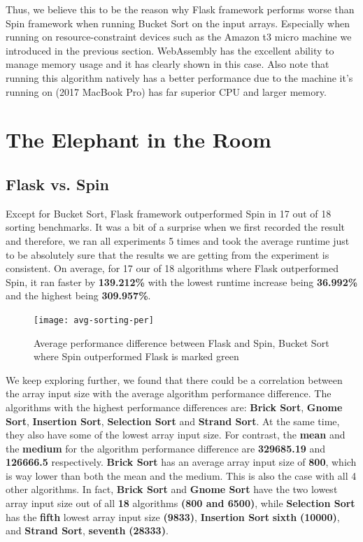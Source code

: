 Thus, we believe this to be the reason why Flask framework performs worse than Spin framework when running Bucket Sort on the input arrays. Especially when running on resource-constraint devices such as the Amazon t3 micro machine we introduced in the previous section. WebAssembly has the excellent ability to manage memory usage and it has clearly shown in this case. Also note that running this algorithm natively has a better performance due to the machine it's running on (2017 MacBook Pro) has far superior CPU and larger memory.

\bigskip
\section{The Elephant in the Room}

\subsection{Flask vs. Spin}

Except for Bucket Sort, Flask framework outperformed Spin in 17 out of 18 sorting benchmarks. It was a bit of a surprise when we first recorded the result and therefore, we ran all experiments 5 times and took the average runtime just to be absolutely sure that the results we are getting from the experiment is consistent. On average, for 17 our of 18 algorithms where Flask outperformed Spin, it ran faster by \textbf{139.212\%} with the lowest runtime increase being \textbf{36.992\%} and the highest being \textbf{309.957\%}.

\bigskip
\begin{figure}[hp]
\centering
\texttt{[image: avg-sorting-per]}
\caption{\footnotesize{Average performance difference between Flask and Spin, Bucket Sort where Spin outperformed Flask is marked green}}
\captionsetup{aboveskip=0pt,font=it}
\end{figure}
\bigskip

We keep exploring further, we found that there could be a correlation between the array input size with the average algorithm performance difference. The algorithms with the highest performance differences are: \textbf{Brick Sort}, \textbf{Gnome Sort}, \textbf{Insertion Sort}, \textbf{Selection Sort} and \textbf{Strand Sort}. At the same time, they also have some of the lowest array input size. For contrast, the \textbf{mean} and the \textbf{medium} for the algorithm performance difference are \textbf{329685.19} and \textbf{126666.5} respectively. \textbf{Brick Sort} has an average array input size of \textbf{800}, which is way lower than both the mean and the medium. This is also the case with all 4 other algorithms. In fact, \textbf{Brick Sort} and \textbf{Gnome Sort} have the two lowest array input size out of all \textbf{18} algorithms \textbf{(800 and 6500)}, while \textbf{Selection Sort} has the \textbf{fifth} lowest array input size \textbf{(9833)}, \textbf{Insertion Sort} \textbf{sixth} \textbf{(10000)}, and \textbf{Strand Sort}, \textbf{seventh} \textbf{(28333)}.

